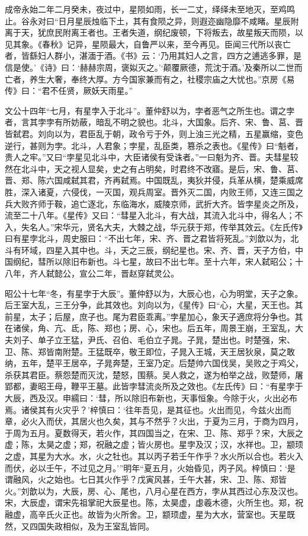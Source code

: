 \documentclass[12pt,UTF8]{ctexbook}
\begin{document}
成帝永始二年二月癸未，夜过中，星陨如雨，长一二丈，绎绎未至地灭，至鸡鸣止。谷永对曰“日月星辰烛临下土，其有食陨之异，则遐迩幽隐靡不咸睹。星辰附离于天，犹庶民附离王者也。王者失道，纲纪废顿，下将叛去，故星叛天而陨，以见其象。《春秋》记异，星陨最大，自鲁严以来，至今再见。臣闻三代所以丧亡者，皆繇妇人群小，湛湎于酒。《书》云：‘乃用其妇人之言，四方之逋逃多罪，是信是使。’《诗》曰：‘赫赫宗周，褒姒灭之。’‘颠覆厥德，荒沈于酒。’及秦所以二世而亡者，养生大奢，奉终大厚。方今国家兼而有之，社稷宗庙之大忧也。”京房《易传》曰：“君不任贤，厥妖天雨星。”



文公十四年“七月，有星孛入于北斗”。董仲舒以为，孛者恶气之所生也。谓之孛者，言其孛孛有所妨蔽，暗乱不明之貌也。北斗，大国象。后齐、宋、鲁、莒、晋皆弑君。刘向以为，君臣乱于朝，政令亏于外，则上浊三光之精，五星赢缩，变色逆行，甚则为孛。北斗，人君象；孛星，乱臣类，篡杀之表也。《星传》曰“魁者，贵人之牢。”又曰“孛星见北斗中，大臣诸侯有受诛者。”一曰魁为齐、晋。夫彗星较然在北斗中，天之视人显矣，史之有占明矣，时君终不改寤。是后，宋、鲁、莒、晋、郑、陈六国咸弑其君，齐再弑焉。中国既乱，夷狄并侵，兵革从横，楚乘威席胜，深入诸夏，六侵伐，一灭国，观兵周室。晋外灭二国，内败王师，又连三国之兵大败齐师于鞍，追亡逐北，东临海水，威陵京师，武折大齐。皆孛星炎之所及，流至二十八年。《星传》又曰：“彗星入北斗，有大战，其流入北斗中，得名人；不入，失名人。”宋华元，贤名大夫，大棘之战，华元获于郑，传举其效云。《左氏传》曰有星孛北斗，周史服曰：“不出七年，宋、齐、晋之君皆将死乱。”刘歆以为，北斗有环域，四星入其中也。斗，天之三辰，纲纪星也。宋、齐、晋，天子方伯，中国纲纪，彗所以除旧布新也。斗七星，故曰不出七年。至十六年，宋人弑昭公；十八年，齐人弑懿公，宣公二年，晋赵穿弑灵公。



昭公十七年“冬，有星孛于大辰”。董仲舒以为，大辰心也，心为明堂，天子之象。后王室大乱，三王分争，此其效也。刘向以为，《星传》曰“心，大星，天王也。其前星，太子；后屋，庶子也。尾为君臣乖离。”孛星加心，象天子適庶将分争也。其在诸侯，角、亢、氐，陈、郑也；房、心，宋也。后五年，周景王崩，王室乱，大夫刘子、单子立王猛，尹氏、召伯、毛伯立子晁。子晁，楚出也。时楚强，宋、卫、陈、郑皆南附楚。王猛既卒，敬王即位，子晁入王城，天王居狄泉，莫之敢纳，五年，楚平王居卒，子晁奔楚，王室乃定。后楚帅六国伐吴，吴败之于鸡父，杀获其君臣。蔡怨楚而灭沈，楚怒，围蔡。吴人救之，遂为柏举之战，败楚师，屠郢都，妻昭王母，鞭平王墓。此皆孛彗流炎所及之效也。《左氏传》曰：“有星孛于大辰，西及汉。申繻曰：‘彗，所以除旧布新也，天事恒象。今除于火，火出必布焉。诸侯其有火灾乎？’梓慎曰：‘往年吾见，是其征也。火出而见，今兹火出而章，必火入而伏，其居火也久矣，其与不然乎？火出，于夏为三月，于商为四月，于周为五月。夏数得天，若火作，其四国当之，在宋、卫、陈、郑乎？宋，大辰之虚；陈，太昊之虚；郑，祝融之虚；皆火房也。星孛及汉；汉，水祥也。卫，颛顼之虚，其星为大水。水，火之牡也。其以丙子若壬午作乎？水火所以合也。若火入而伏，必以壬午，不过见之月。’”明年“夏五月，火始昏见，丙子风。梓慎曰：‘是谓融风，火之始也。七日其火作乎？戊寅风甚，壬午大甚，宋、卫、陈、郑皆火。”刘歆以为，大辰，房、心、尾也，八月心星在西方，孛从其西过心东及汉也。宋，大辰虚，谓宋先祖掌祀大辰星也。陈，太昊虚，虙羲木德，火所生也。郑，祝融虚，高辛氏火正也。故皆为火所舍。卫，颛顼虚，星为大水，营室也。天星既然，又四国失政相似，及为王室乱皆同。
\end{document}
